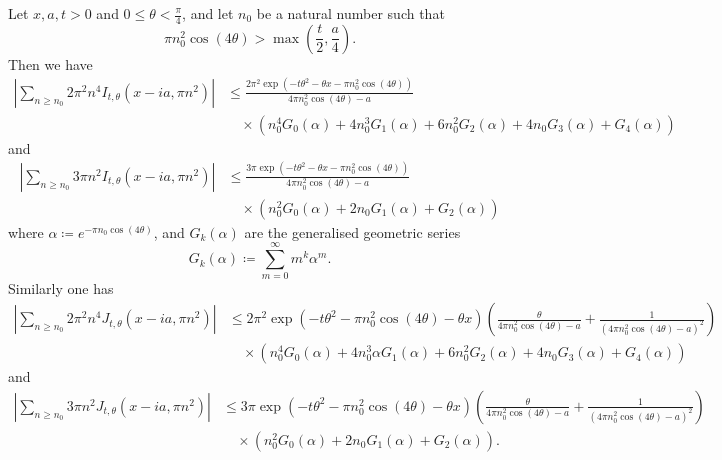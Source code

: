 \begin{corollary}  Let $x,a,t>0$ and $0 \leq \theta < \frac{\pi}{4}$, and let $n_0$ be a natural number such that
$$\pi n_0^2 \cos(4\theta) > \max(\frac{t}{2}, \frac{a}{4} ).$$
Then we have
\begin{equation}\label{itail1}
\begin{split}
\left|\sum_{n \geq n_0} 2\pi^2 n^4 I_{t,\theta}(x-ia, \pi n^2)\right| &\leq
\frac{2\pi^2 \exp(-t \theta^2 - \theta x - \pi n_0^2 \cos(4\theta))}{4\pi n_0^2 \cos(4\theta) - a} \\
&\quad \times \left( n_0^4 G_0(\alpha) + 4 n_0^3 G_1(\alpha) + 6 n_0^2 G_2(\alpha) + 4 n_0 G_3(\alpha) + G_4(\alpha) \right)
\end{split}
\end{equation}
and
\begin{equation}\label{itail2}
\begin{split}
\left|\sum_{n \geq n_0} 3\pi n^2 I_{t,\theta}(x-ia, \pi n^2)\right| &\leq
\frac{3\pi \exp(-t \theta^2 - \theta x - \pi n_0^2 \cos(4\theta))}{4\pi n_0^2 \cos(4\theta) - a} \\
&\quad \times ( n_0^2 G_0(\alpha) + 2n_0 G_1(\alpha) + G_2(\alpha) )
\end{split}
\end{equation}
where $\alpha \coloneqq  e^{-\pi n_0 \cos(4\theta)}$, and $G_k(\alpha)$ are the generalised geometric series
$$ G_k(\alpha) \coloneqq \sum_{m=0}^\infty m^k \alpha^m.$$  
Similarly one has
\begin{equation}\label{jtail1}
\begin{split}
 \left|\sum_{n \geq n_0} 2\pi^2 n^4 J_{t,\theta}(x-ia, \pi n^2)\right| &\leq 2\pi^2 \exp( -t \theta^2 - \pi n_0^2 \cos(4\theta) - \theta x )
\left( \frac{\theta}{4 \pi n_0^2 \cos(4\theta) - a} + \frac{1}{(4 \pi n_0^2 \cos(4 \theta) - a)^2}\right )\\
&\quad \times \left( n_0^4 G_0(\alpha) + 
4 n_0^3 \alpha G_1(\alpha) + 6 n_0^2 G_2(\alpha) + 4n_0 G_3(\alpha) + G_4(\alpha) \right )
\end{split}
\end{equation}
and
\begin{equation}\label{jtail2}
\begin{split}
 \left|\sum_{n \geq n_0} 3\pi n^2 J_{t,\theta}(x-ia, \pi n^2)\right| &\leq 3\pi \exp( -t \theta^2 - \pi n_0^2 \cos(4\theta) - \theta x )
\left( \frac{\theta}{4 \pi n_0^2 \cos(4\theta) - a} + \frac{1}{(4 \pi n_0^2 \cos(4\theta) - a)^2} \right)\\
&\quad \times \left( n_0^2 G_0(\alpha) + 2n_0 G_1(\alpha) + G_2(\alpha) \right).
\end{split}
\end{equation}
\end{corollary}

